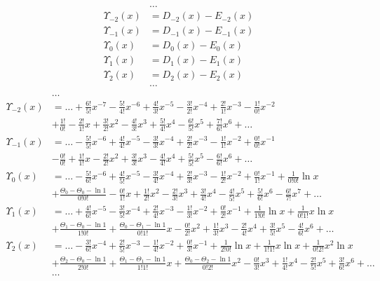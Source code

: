 \begin{equation*} \begin{aligned}
&\ldots \\
\Upsilon_{-2}(x) &= D_{-2}(x) - E_{-2}(x) \\
\Upsilon_{-1}(x) &= D_{-1}(x) - E_{-1}(x) \\
\Upsilon_0(x) &= D_0(x) - E_0(x) \\
\Upsilon_1(x) &= D_1(x) - E_1(x) \\
\Upsilon_2(x) &= D_2(x) - E_2(x) \\
&\ldots \\
\end{aligned} \end{equation*}
%
\begin{equation*} \begin{aligned}
&\ldots \\
%
\Upsilon_{-2}(x) &=
  \ldots
+ \frac{6!}{5!} x^{-7}
- \frac{5!}{4!} x^{-6}
+ \frac{4!}{3!} x^{-5}
- \frac{3!}{2!} x^{-4}
+ \frac{2!}{1!} x^{-3}
- \frac{1!}{0!} x^{-2} \\ &
+ \frac{1!}{0!}
- \frac{2!}{1!} x
+ \frac{3!}{2!} x^2
- \frac{4!}{3!} x^3
+ \frac{5!}{4!} x^4
- \frac{6!}{5!} x^5
+ \frac{7!}{6!} x^6
+ \ldots \\
%
\Upsilon_{-1}(x) &=   
  \ldots
- \frac{5!}{5!} x^{-6}
+ \frac{4!}{4!} x^{-5}
- \frac{3!}{3!} x^{-4}
+ \frac{2!}{2!} x^{-3}
- \frac{1!}{1!} x^{-2}
+ \frac{0!}{0!} x^{-1} \\ &
- \frac{0!}{0!}
+ \frac{1!}{1!} x
- \frac{2!}{2!} x^2
+ \frac{3!}{3!} x^3
- \frac{4!}{4!} x^4
+ \frac{5!}{5!} x^5
- \frac{6!}{6!} x^6
+ \ldots \\
%
\Upsilon_0(x) &=   
  \ldots
- \frac{5!}{6!} x^{-6}
+ \frac{4!}{5!} x^{-5}
- \frac{3!}{4!} x^{-4}
+ \frac{2!}{3!} x^{-3}
- \frac{1!}{2!} x^{-2}
+ \frac{0!}{1!} x^{-1}
+ \frac{1}{0!0!} \ln{x} \\ &
+ \frac{\Theta_0 - \Theta_0 - \ln{1}}{0!0!}
- \frac{0!}{1!} x 
+ \frac{1!}{2!} x^2
- \frac{2!}{3!} x^3
+ \frac{3!}{4!} x^4
- \frac{4!}{5!} x^5
+ \frac{5!}{6!} x^6
- \frac{6!}{7!} x^7
+ \ldots \\
%
\Upsilon_1(x) &=   
  \ldots
+ \frac{4!}{6!} x^{-5}
- \frac{3!}{5!} x^{-4}
+ \frac{2!}{4!} x^{-3}
- \frac{1!}{3!} x^{-2}
+ \frac{0!}{2!} x^{-1}
+ \frac{1}{1!0!} \ln{x}
+ \frac{1}{0!1!} x \ln{x} \\ &
+ \frac{\Theta_1 - \Theta_0 - \ln{1}}{1!0!}
+ \frac{\Theta_0 - \Theta_1 - \ln{1}}{0!1!} x
- \frac{0!}{2!} x^2
+ \frac{1!}{3!} x^3
- \frac{2!}{4!} x^4
+ \frac{3!}{5!} x^5
- \frac{4!}{6!} x^6
+ \ldots \\
%
\Upsilon_2(x) &=   
  \ldots
- \frac{3!}{6!} x^{-4}
+ \frac{2!}{5!} x^{-3}
- \frac{1!}{4!} x^{-2}
+ \frac{0!}{3!} x^{-1}
+ \frac{1}{2!0!} \ln{x}
+ \frac{1}{1!1!} x \ln{x}
+ \frac{1}{0!2!} x^2 \ln{x} \\ &
+ \frac{\Theta_2 - \Theta_0 - \ln{1}}{2!0!}
+ \frac{\Theta_1 - \Theta_1 - \ln{1}}{1!1!} x
+ \frac{\Theta_0 - \Theta_2 - \ln{1}}{0!2!} x^2
- \frac{0!}{3!} x^3
+ \frac{1!}{4!} x^4
- \frac{2!}{5!} x^5
+ \frac{3!}{6!} x^6
+ \ldots \\
%
&\ldots \\
\end{aligned} \end{equation*}